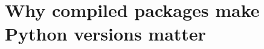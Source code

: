 \chapter{Why compiled packages make Python versions matter}
\label{ch:why-compiled-packages-make-python}

